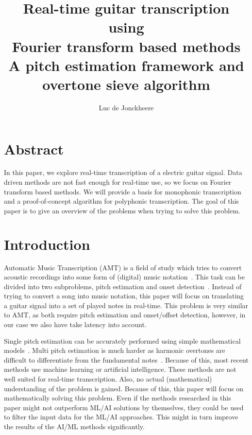 \documentclass[10pt,twocolumn]{article}
\title{\textbf{Real-time guitar transcription using\\Fourier transform based methods}\\A pitch estimation framework and overtone sieve algorithm}
\author{Luc de Jonckheere}
\begin{document}

\maketitle


\section*{Abstract}
In this paper, we explore real-time transcription of a electric guitar signal. Data driven methods are not fast enough for real-time use, so we focus on Fourier transform based methods. We will provide a basis for monophonic transcription and a proof-of-concept algorithm for polyphonic transcription. The goal of this paper is to give an overview of the problems when trying to solve this problem.



\section{Introduction}
Automatic Music Transcription (AMT) is a field of study which tries to convert acoustic recordings into some form of (digital) music notation~\cite{survey1}. This task can be divided into two subproblems, pitch estimation and onset detection~\cite{survey2}. Instead of trying to convert a song into music notation, this paper will focus on translating a guitar signal into a set of played notes in real-time. This problem is very similar to AMT, as both require pitch estimation and onset/offset detection, however, in our case we also have take latency into account.

Single pitch estimation can be accurately performed using simple mathematical models~\cite{mono}. Multi pitch estimation is much harder as harmonic overtones are difficult to differentiate from the fundamental notes~\cite{oud}. Because of this, most recent methods use machine learning or artificial intelligence. These methods are not well suited for real-time transcription. Also, no actual (mathematical) understanding of the problem is gained. Because of this, this paper will focus on mathematically solving this problem. Even if the methods researched in this paper might not outperform ML/AI solutions by themselves, they could be used to filter the input data for the ML/AI approaches. This might in turn improve the results of the AI/ML methods significantly.
\end{document}
